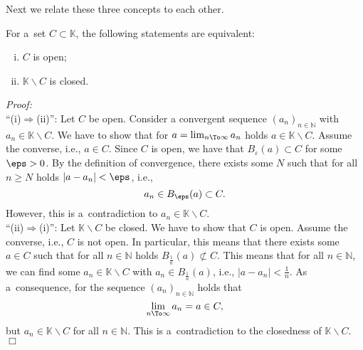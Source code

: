 Next we relate these three concepts to each other.
\begin{Theorem}{}
  For a~set $C\subset \mathbb{K}$, the following statements are equivalent:
\begin{enumerate}[(i)]
 \item $C$ is open;
 \item $\mathbb{K}\backslash C$ is closed.
\end{enumerate}
\end{Theorem}
{\em Proof:}\\
``(i)$\Rightarrow$(ii)'':
Let $C$ be open. Consider a convergent sequence $(a_{n})_{n\in\mathbb{N}}$ with $a_n\in \mathbb{K}\backslash C$. We have to show that for $a=\lim_{n\To\infty}a_n$ holds $a\in \mathbb{K}\backslash C$. Assume the converse, i.e., $a\in C$. Since $C$ is open, we have that $B_{\varepsilon}(a)\subset C$ for some $\eps>0$. By the definition of convergence, there exists some $N$ such that for all $n\geq N$ holds $|a-a_n|<\eps$, i.e., \[a_n\in B_{\eps}(a)\subset C.\] However, this is a~contradiction to $a_n\in \mathbb{K}\backslash C$.\\

``(ii)$\Rightarrow$(i)'':
Let $\mathbb{K}\backslash C$ be closed. We have to show that $C$ is open. Assume the converse, i.e., $C$ is not open. In particular, this means that there exists some $a\in C$ such that for all $n\in\mathbb{N}$ holds $B_{\frac1n}(a)\not\subset C$. This means that for all $n\in \mathbb{N}$, we can find some $a_n\in \mathbb{K}\backslash C$ with $a_n\in B_{\frac1n}(a)$, i.e., $|a-a_n|<\frac1n$. As a~consequence, for the sequence $(a_n)_{n\in\mathbb{N}}$ holds that
\[\lim_{n\To\infty}a_n=a\in C,\]
but $a_n\in \mathbb{K}\backslash C$ for all $n\in\mathbb{N}$. This is a~contradiction to the closedness of $\mathbb{K}\backslash C$.\hfill$\Box$
